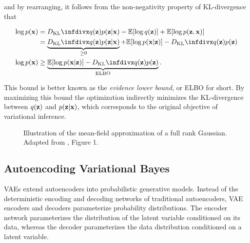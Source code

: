 and by rearranging, it follows from the non-negativity property of KL-divergence that

\begin{equation}
\begin{aligned}
\log p(\bx) &= \dkl{q(\bz)}{p(\bz \vert \bx)} - \mathbb{E}[\log q(\bz)] + \mathbb{E}[\log p(\bz, \bx)] \\
            &= \underbrace{\dkl{q(\bz)}{p(\bz \vert \bx)}}_{\geq 0} + \mathbb{E}[\log p(\bx \vert \bz)] - \dkl{q(\bz)}{p(\bz)} \\
\log p(\bx) &\geq \underbrace{\mathbb{E}[\log p(\bx \vert \bz)] - \dkl{q(\bz)}{p(\bz)}}_{\text{ELBO}}.
\end{aligned}
\end{equation}

This bound is better known as the \textit{evidence lower bound}, or ELBO for short. By maximizing this bound the optimization indirectly minimizes the KL-divergence between $q(\mathbf{z})$ and $p(\mathbf{z} \vert \mathbf{x})$, which corresponds to the original objective of variational inference.


\begin{figure}[!htb]
  \centering
  \resizebox{0.5\textwidth}{!}{\unskip}
  \caption{Illustration of the mean-field approximation of a full rank Gaussian. Adapted from \cite{variational_inference_review}, Figure 1.}
  \label{fig:mean_field_approximation}
\end{figure}

\subsection{Autoencoding Variational Bayes}

VAEs extend autoencoders into probabilistic generative models. Instead of the deterministic encoding and decoding networks of traditional autoencoders, VAE encoders and decoders parameterize probability distributions. The encoder network parameterizes the distribution of the latent variable conditioned on its data, whereas the decoder parameterizes the data distribution conditioned on a latent variable.


